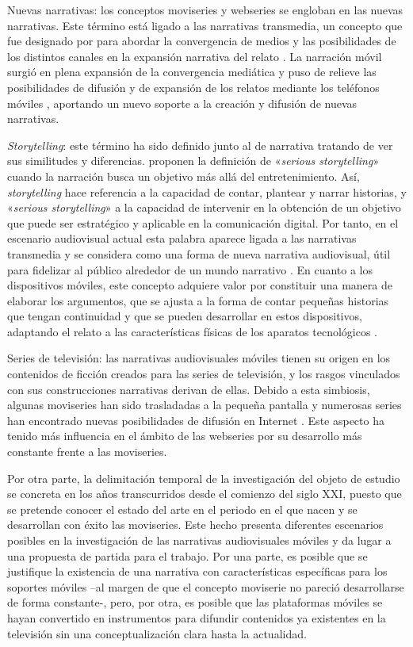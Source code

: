 \documentclass[spanish]{textolivre}
\begin{document}
Nuevas narrativas: los conceptos moviseries y webseries se engloban en las nuevas narrativas. Este término está ligado a las narrativas transmedia, un concepto que fue designado por \textcite{jenkins2003} para abordar la convergencia de medios y las posibilidades de los distintos canales en la expansión narrativa del relato \cite{scolari2013}. La narración móvil surgió en plena expansión de la convergencia mediática y puso de relieve las posibilidades de difusión y de expansión de los relatos mediante los teléfonos móviles \cite{rincon2011}, aportando un nuevo soporte a la creación y difusión de nuevas narrativas. 

\emph{Storytelling}: este término ha sido definido junto al de narrativa tratando de ver sus similitudes y diferencias. \textcite{lugmayr2017} proponen la definición de «\emph{serious storytelling}» cuando la narración busca un objetivo más allá del entretenimiento. Así, \emph{storytelling} hace referencia a la capacidad de contar, plantear y narrar historias, y «\emph{serious storytelling}» a la capacidad de intervenir en la obtención de un objetivo que puede ser estratégico y aplicable en la comunicación digital. Por tanto, en el escenario audiovisual actual esta palabra aparece ligada a las narrativas transmedia y se considera como una forma de nueva narrativa audiovisual, útil para fidelizar al público alrededor de un mundo narrativo \cite{scolari2017}. En cuanto a los dispositivos móviles, este concepto adquiere valor por constituir una manera de elaborar los argumentos, que se ajusta a la forma de contar pequeñas historias que tengan continuidad y que se pueden desarrollar en estos dispositivos, adaptando el relato a las características físicas de los aparatos tecnológicos \cite{morante2011}. 

Series de televisión: las narrativas audiovisuales móviles tienen su origen en los contenidos de ficción creados para las series de televisión, y los rasgos vinculados con sus construcciones narrativas derivan de ellas. Debido a esta simbiosis, algunas moviseries han sido trasladadas a la pequeña pantalla \cite{saez2010} y numerosas series han encontrado nuevas posibilidades de difusión en Internet \cite{adelantadomateu2011}. Este aspecto ha tenido más influencia en el ámbito de las webseries \cite{montoyabermudez2016, barron2013} por su desarrollo más constante frente a las moviseries. 

Por otra parte, la delimitación temporal de la investigación del objeto de estudio se concreta en los años transcurridos desde el comienzo del siglo XXI, puesto que se pretende conocer el estado del arte en el periodo en el que nacen y se desarrollan con éxito las moviseries. Este hecho presenta diferentes escenarios posibles en la investigación de las narrativas audiovisuales móviles y da lugar a una propuesta de partida para el trabajo. Por una parte, es posible que se justifique la existencia de una narrativa con características específicas para los soportes móviles –al margen de que el concepto moviserie no pareció desarrollarse de forma constante-, pero, por otra, es posible que las plataformas móviles se hayan convertido en instrumentos para difundir contenidos ya existentes en la televisión sin una conceptualización clara hasta la actualidad. 
\end{document}
